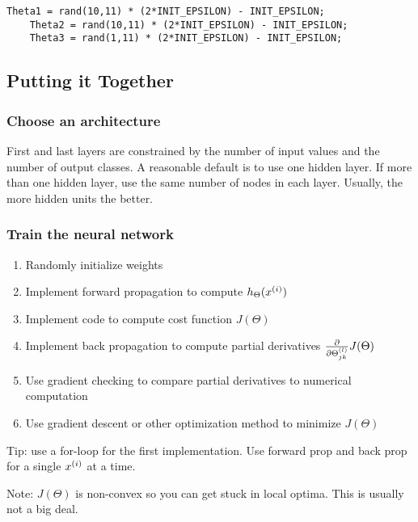 \begin{lstlisting}[style=Matlab-editor]
    Theta1 = rand(10,11) * (2*INIT_EPSILON) - INIT_EPSILON;
    Theta2 = rand(10,11) * (2*INIT_EPSILON) - INIT_EPSILON;
    Theta3 = rand(1,11) * (2*INIT_EPSILON) - INIT_EPSILON;
\end{lstlisting}

\subsection{Putting it Together}

\subsubsection{Choose an architecture}

First and last layers are constrained by the number of input values
and the number of output classes.
A reasonable default is to use one hidden layer.
If more than one hidden layer, use the same number of nodes in each layer.
Usually, the more hidden units the better.

\subsubsection{Train the neural network}

\begin{enumerate}
    \item Randomly initialize weights
    \item Implement forward propagation to compute $h_\Theta(x_{}^{(i)})$
    \item Implement code to compute cost function $J(\Theta)$
    \item Implement back propagation to compute partial derivatives 
        $\pdv{\Theta_{jk}^{(l)}}J(\Theta)$
    \item Use gradient checking to compare partial derivatives to numerical computation
    \item Use gradient descent or other optimization method to minimize $J(\Theta)$
\end{enumerate}

Tip: use a for-loop for the first implementation.
Use forward prop and back prop for a single $x_{}^{(i)}$ at a time.

Note: $J(\Theta)$ is non-convex so you can get stuck in local optima.
This is usually not a big deal.